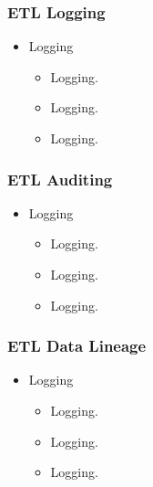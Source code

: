 
\begin{frame}
    \frametitle{ETL Logging}
    \begin{itemize}[<+->]
        \item Logging
        \begin{itemize}[<+->]
            \item  Logging.
            \item  Logging.
            \item  Logging.


        \end{itemize}
    \end{itemize}
\end{frame}


\begin{frame}
    \frametitle{ETL Auditing}
    \begin{itemize}[<+->]
        \item Logging
        \begin{itemize}[<+->]
            \item  Logging.
            \item  Logging.
            \item  Logging.


        \end{itemize}
    \end{itemize}
\end{frame}


\begin{frame}
    \frametitle{ETL Data Lineage}
    \begin{itemize}[<+->]
        \item Logging
        \begin{itemize}[<+->]
            \item  Logging.
            \item  Logging.
            \item  Logging.


        \end{itemize}
    \end{itemize}
\end{frame}

